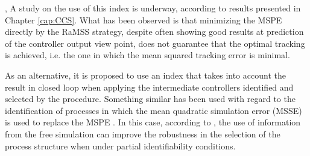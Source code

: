 , 
A study on the use of this index is underway, according to results presented in Chapter \ref{cap:CCS}. What has been observed is that minimizing the MSPE directly by the RaMSS strategy, despite often showing good results at prediction of the controller output view point, does not guarantee that the optimal tracking is achieved, i.e. the one in which the mean squared tracking error is minimal.

As an alternative, it is proposed to use an index that takes into account the result in closed loop when applying the intermediate controllers identified and selected by the procedure. Something similar has been used with regard to the identification of processes in which the mean quadratic simulation error (MSSE) is used to replace the MSPE \citep{aguirre2010}. In this case, according to \citep {piroddi2003}, the use of information from the free simulation can improve the robustness in the selection of the process structure when under partial identifiability conditions.

